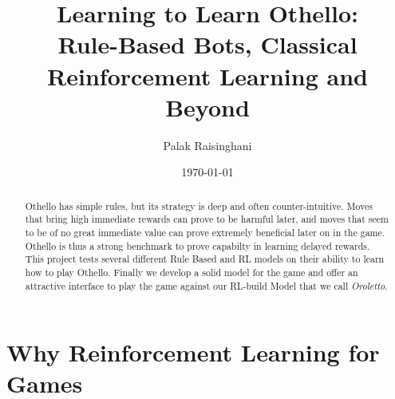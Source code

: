 \documentclass[11pt]{article}
\title{Learning to Learn Othello:\\Rule-Based Bots, Classical Reinforcement Learning and Beyond}
\author{Palak Raisinghani}
\date{\today}
\begin{document}

\maketitle

\begin{abstract}
Othello has simple rules, but its strategy is deep and often counter-intuitive. Moves that bring high immediate rewards can prove to be harmful later, and moves that seem to be of no great immediate value can prove extremely beneficial later on in the game. Othello is thus a strong benchmark to prove capabilty in learning delayed rewards.
This project tests several different Rule Based and RL models on their ability to learn how to play Othello. Finally we develop a solid model for the game and offer an attractive interface to play the game against our RL-build Model that we call \textit{Oroletto}.

\end{abstract}

\tableofcontents


\section{Why Reinforcement Learning for Games}
\label{sec:whyrl}
\end{document}
